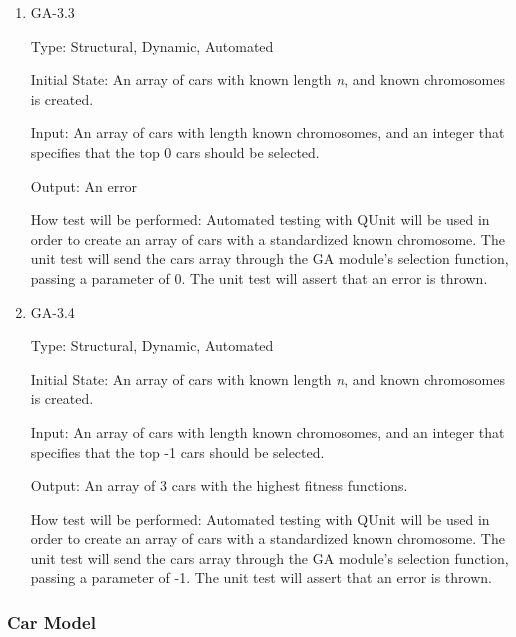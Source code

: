 \documentclass[12pt, titlepage]{article}
\begin{document}
\begin{enumerate}
\item{GA-3.3\\}

Type: Structural, Dynamic, Automated
					
Initial State: An array of cars with known length \textit{n}, and known 
chromosomes is created.
					
Input: An array of cars with length known chromosomes, and an integer that 
specifies that the top  0 cars should be selected.
					
Output: An error
					
How test will be performed: Automated testing with QUnit will be used in order 
to create an array of cars with a standardized known chromosome. The unit test 
will send the cars array through the GA module's selection function, passing a 
parameter of 0. The unit test will assert that an error is thrown.


\item{GA-3.4\\}

Type: Structural, Dynamic, Automated
					
Initial State: An array of cars with known length \textit{n}, and known 
chromosomes is created.
					
Input: An array of cars with length known chromosomes, and an integer that 
specifies that the top  -1 cars should be selected.
					
Output: An array of 3 cars with the highest fitness functions.
					
How test will be performed: Automated testing with QUnit will be used in order 
to create an array of cars with a standardized known chromosome. The unit test 
will send the cars array through the GA module's selection function, passing a 
parameter of -1. The unit test will assert that an error is thrown.

\end{enumerate}

\subsubsection{Car Model}
\end{document}
